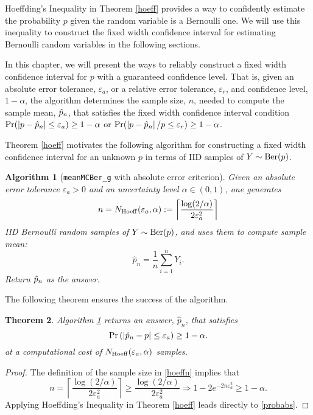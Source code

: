 \documentclass{iitthesis}
\newtheorem{theorem}{Theorem}[section]
\newtheorem{algorithm}[theorem]{Algorithm}
\theoremstyle{definition}
\begin{document}
Hoeffding's Inequality in Theorem \ref{hoeff} provides a way to confidently estimate the probability $p$ given the random variable is a Bernoulli one. We will use this inequality to construct the fixed width confidence interval for estimating Bernoulli random variables in the following sections.

In this chapter, we will present the ways to reliably construct a fixed width confidence interval for $p$ with a guaranteed confidence level. That is, given an absolute error tolerance, $\varepsilon_a$, or a relative error tolerance, $\varepsilon_r$, and confidence level, $1-\alpha$, the algorithm determines the sample size, $n$, needed to compute the sample mean, $\hat{p}_n$, that satisfies the fixed width confidence interval condition $\Pr(\left \lvert p-\hat{p}_n \right \rvert\leq \varepsilon_a) \geq 1-\alpha$ or $\Pr(\left \lvert p-\hat{p}_n \right \rvert/p\leq \varepsilon_r) \geq 1-\alpha$.  

 \label{sec:meanMCberg}

Theorem \ref{hoeff} motivates the following algorithm for constructing a fixed width confidence interval for an unknown $p$ in terms of IID samples of $Y\sim \operatorname{Ber}(p)$.
\begin{algorithm}[{\tt meanMCBer\_g} with absolute error criterion]\label{algabs}
Given an absolute error tolerance $\varepsilon_a > 0$ and an uncertainty level $\alpha \in (0,1)$, one generates
\begin{equation}\label{hoeffn}
n = N_{\operatorname{Hoeff}}(\varepsilon_a,\alpha):= \left \lceil  \frac{\log(2/\alpha)}{2\varepsilon_a^2} \right \rceil
\end{equation}
IID Bernoulli random samples of $Y \sim \operatorname{Ber}(p)$, and uses them to compute sample mean:
\begin{equation} \label{abserrp}
\hat{p}_n = \frac1n\sum_{i =1}^n Y_i.
\end{equation}
Return $\hat{p}_n$ as the answer.
\end{algorithm}
The following theorem ensures the success of the algorithm.
\begin{theorem}
Algorithm \ref{algabs} returns an answer, $\hat{p}_n$, that satisfies 
\begin{equation}\label{probabs}
\Pr\left(\left \lvert \hat{p}_n -p \right \rvert \leq \varepsilon_a\right) \geq 1-\alpha.
\end{equation}
at a computational cost of $N_{\operatorname{Hoeff}}(\varepsilon_a,\alpha)$ samples.
\end{theorem}
\begin{proof}
The definition of the sample size in \eqref{hoeffn} implies that
\begin{equation*}
n = \left \lceil \frac{\log(2/\alpha)}{2\varepsilon_a^2} \right \rceil \geq  \frac{\log(2/\alpha)}{2\varepsilon_a^2} \Rightarrow 
1- 2e^{-2n\varepsilon_a^2} \geq 1-\alpha.
\end{equation*}
Applying Hoeffding's Inequality in Theorem \ref{hoeff} leads directly to \eqref{probabs}. 
\end{proof}
\end{document}
